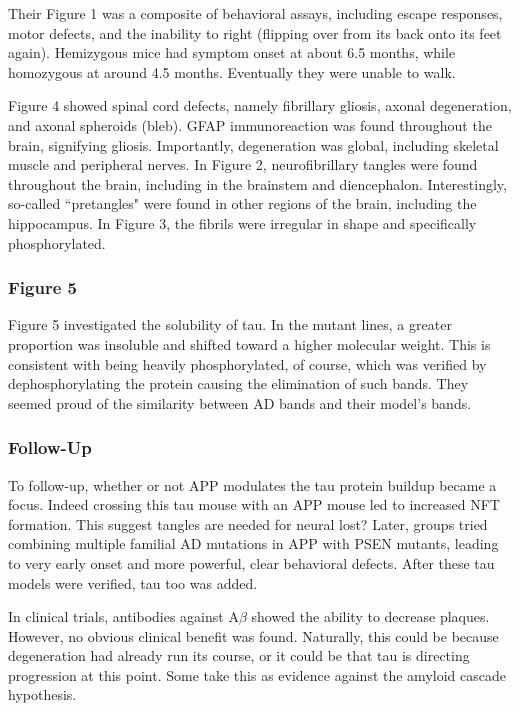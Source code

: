 \documentclass[12pt]{report}
\newcommand{\be}{\beta}
\begin{document}
 Their Figure 1 was a composite of behavioral assays, including escape responses, motor defects, and the inability to right (flipping over from its back onto its feet again). Hemizygous mice had symptom onset at about 6.5 months, while homozygous at around 4.5 months. Eventually they were unable to walk.\newline

Figure 4 showed spinal cord defects, namely fibrillary gliosis, axonal degeneration, and axonal spheroids (bleb). GFAP immunoreaction was found throughout the brain, signifying gliosis. Importantly, degeneration was global, including skeletal muscle and peripheral nerves. In Figure 2, neurofibrillary tangles were found throughout the brain, including in the brainstem and diencephalon. Interestingly, so-called ``pretangles" were found in other regions of the brain, including the hippocampus. In Figure 3, the fibrils were irregular in shape and specifically phosphorylated.

 \subsubsection*{Figure 5}

Figure 5 investigated the solubility of tau. In the mutant lines, a greater proportion was insoluble and shifted toward a higher molecular weight. This is consistent with being heavily phosphorylated, of course, which was verified by dephosphorylating the protein causing the elimination of such bands. They seemed proud of the similarity between AD bands and their model's bands. 

\subsubsection*{Follow-Up}

To follow-up, whether or not APP modulates the tau protein buildup became a focus. Indeed crossing this tau mouse with an APP mouse led to increased NFT formation. This suggest tangles are needed for neural lost?  Later, groups tried combining multiple familial AD mutations in APP with PSEN mutants, leading to very early onset and more powerful, clear behavioral defects. After these tau models were verified, tau too was added.\newline

In clinical trials, antibodies against A$\be$ showed the ability to decrease plaques. However, no obvious clinical benefit was found. Naturally, this could be because degeneration had already run its course, or it could be that tau is directing progression at this point. Some take this as evidence against the amyloid cascade hypothesis. 
\end{document}
